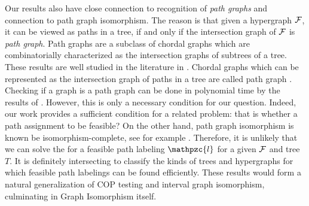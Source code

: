 \documentclass[11pt,
               envcountsect,
               envcountsame]
               {../lib/llncs2e/llncs}
\def\cF{{\cal F}}
\def\cl{\mathpzc{l}}
\begin{document}
\noindent 
Our results also have close connection to recognition of {\em path
  graphs} and connection to path graph isomorphism.  The reason is
that given a hypergraph $\cF$, it can be viewed as paths in a tree, if
and only if the intersection graph of $\cF$ is {\em path graph}.  Path
graphs are a subclass of chordal graphs which are combinatorially
characterized as the intersection graphs of subtrees of a tree.  These
results are well studied in the literature in
\cite{plr70,gav78,bp93,mcg04}.  Chordal graphs which can be
represented as the intersection graph of paths in a tree are called
path graph \cite{mcg04}.  Checking if a graph is a path graph can be
done in polynomial time by the results of \cite{gav78,aas93}.
However, this is only a necessary condition for our question.  Indeed,
our work provides a sufficient condition for a related problem: that
is whether a path assignment to be feasible?  On the other hand, path
graph isomorphism is known be isomorphism-complete, see for example
\cite{kklv10}. Therefore, it is unlikely that we can solve the for a
feasible path labeling $\cl$ for a given $\cF$ and tree $T$.  It is
definitely intersecting to classify the kinds of trees and hypergraphs
for which feasible path labelings can be found efficiently.  These
results would form a natural generalization of COP testing and
interval graph isomorphism, culminating in Graph Isomorphism itself.
\end{document}
